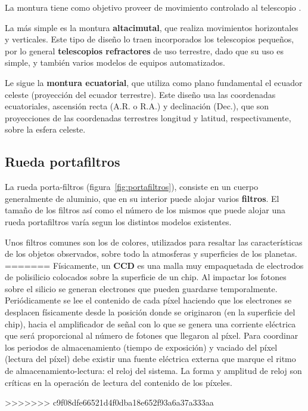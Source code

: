 \begin{itemize}
\begin{itemize}
La montura tiene como objetivo proveer de movimiento controlado al telescopio \cite{montura}.


La más simple es la montura \textbf{altacimutal}, que realiza movimientos horizontales y verticales. Este tipo de diseño lo traen incorporados los telescopios pequeños, por lo general \textbf{telescopios refractores} de uso terrestre, dado que su uso es simple, y también varios modelos de equipos automatizados.


Le sigue la \textbf{montura ecuatorial}, que utiliza como plano fundamental el ecuador celeste (proyección del ecuador terrestre). Este diseño usa las coordenadas ecuatoriales, ascensión recta (A.R. o R.A.) y declinación (Dec.), que son proyecciones de las coordenadas terrestres longitud y latitud, respectivamente, sobre la esfera celeste. 


\subsection{Rueda portafiltros} \label{filtros}

La rueda porta-filtros (figura~\ref{fig:portafiltros}), consiste en un cuerpo generalmente de aluminio, que en su interior puede alojar varios \textbf{filtros}. El tamaño de los filtros así como el número de los mismos que puede alojar una rueda portafiltros varía segun los distintos modelos existentes.

Unos filtros comunes son los de colores, utilizados para resaltar las características de los objetos observados, sobre todo la atmosferas y superficies de los planetas.
=======
\bigskip
Físicamente, un \textbf{CCD} es una malla muy empaquetada de electrodos de polisilicio colocados sobre la superficie de un chip. Al impactar los fotones sobre el silicio se generan electrones que pueden guardarse temporalmente. Periódicamente se lee el contenido de cada píxel haciendo que los electrones se desplacen físicamente desde la posición donde se originaron (en la superficie del chip), hacia el amplificador de señal con lo que se genera una corriente eléctrica que será proporcional al número de fotones que llegaron al píxel. Para coordinar los periodos de almacenamiento (tiempo de exposición) y vaciado del píxel (lectura del píxel) debe existir una fuente eléctrica externa que marque el ritmo de almacenamiento-lectura: el reloj del sistema. La forma y amplitud de reloj son críticas en la operación de lectura del contenido de los píxeles.

>>>>>>> c9f08dfe66521d4f0dba18e652f93a6a37a333aa



\end{itemize}
\end{itemize}

